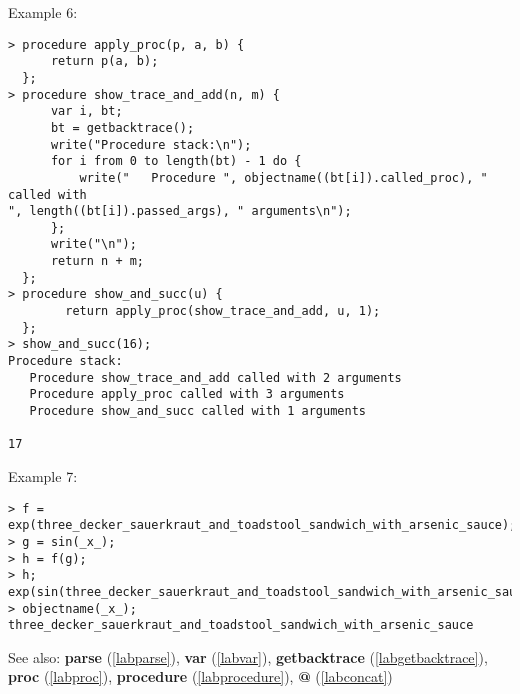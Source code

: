 \noindent Example 6: 
\begin{center}\begin{minipage}{15cm}\begin{Verbatim}[frame=single,commandchars=\\\|\~]
> procedure apply_proc(p, a, b) {
      return p(a, b);
  };
> procedure show_trace_and_add(n, m) {
      var i, bt;
      bt = getbacktrace();
      write("Procedure stack:\n");
      for i from 0 to length(bt) - 1 do {
          write("   Procedure ", objectname((bt[i]).called_proc), " called with 
", length((bt[i]).passed_args), " arguments\n");
      };
      write("\n");
      return n + m;
  };
> procedure show_and_succ(u) {
        return apply_proc(show_trace_and_add, u, 1);
  };
> show_and_succ(16);
Procedure stack:
   Procedure show_trace_and_add called with 2 arguments
   Procedure apply_proc called with 3 arguments
   Procedure show_and_succ called with 1 arguments

17
\end{Verbatim}
\end{minipage}\end{center}
\noindent Example 7: 
\begin{center}\begin{minipage}{15cm}\begin{Verbatim}[frame=single,commandchars=\\\|\~]
> f = exp(three_decker_sauerkraut_and_toadstool_sandwich_with_arsenic_sauce);
> g = sin(_x_);
> h = f(g);
> h;
exp(sin(three_decker_sauerkraut_and_toadstool_sandwich_with_arsenic_sauce))
> objectname(_x_);
three_decker_sauerkraut_and_toadstool_sandwich_with_arsenic_sauce
\end{Verbatim}
\end{minipage}\end{center}
See also: \textbf{parse} (\ref{labparse}), \textbf{var} (\ref{labvar}), \textbf{getbacktrace} (\ref{labgetbacktrace}), \textbf{proc} (\ref{labproc}), \textbf{procedure} (\ref{labprocedure}), \textbf{@} (\ref{labconcat})
